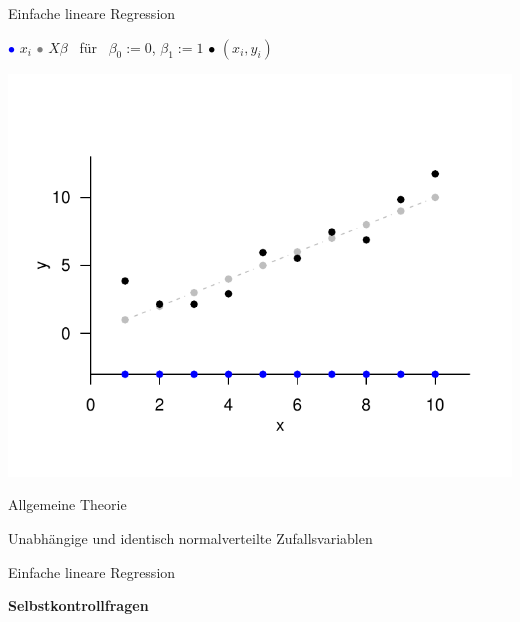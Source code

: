 \documentclass[
  8pt,
  ignorenonframetext,
]{beamer}
\begin{document}
\begin{frame}{Einfache lineare Regression}
\protect\hypertarget{einfache-lineare-regression-2}{}
\vspace{3mm}
\normalsize
\center

\textcolor{blue}{$\bullet$} \(x_i\) \hspace{2mm}
\textcolor{grey}{$\bullet$} \(X\beta\) \mbox{ für } \(\beta_0 := 0\),
\(\beta_1 := 1\) \hspace{2mm} \hspace{2mm} \textcolor{black}{$\bullet$}
\((x_i,y_i)\) \vspace{-2mm}

\begin{center}\includegraphics[width=0.8\linewidth]{5_Abbildungen/alm_5_elr} \end{center}
\end{frame}

\begin{frame}{}
\protect\hypertarget{section-11}{}
\large
{}
\vfill

Allgemeine Theorie

Unabhängige und identisch normalverteilte Zufallsvariablen

Einfache lineare Regression

\textbf{Selbstkontrollfragen} \vfill
\end{frame}
\end{document}
